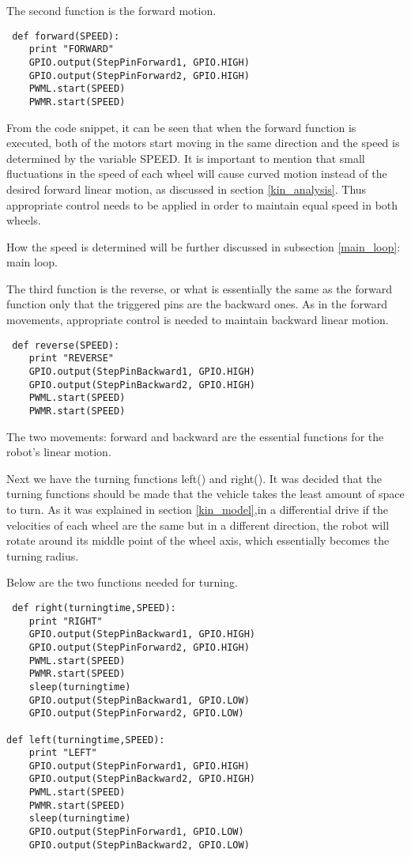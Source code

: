 The second function is the forward motion.

\begin{lstlisting}
 def forward(SPEED):
	print "FORWARD"
	GPIO.output(StepPinForward1, GPIO.HIGH)
	GPIO.output(StepPinForward2, GPIO.HIGH)
	PWML.start(SPEED)
	PWMR.start(SPEED)
\end{lstlisting}

From the code snippet, it can be seen that when the forward function is executed, both of the motors start moving in the same direction and the speed is determined by the variable SPEED. It is important to mention that small fluctuations in the speed of each wheel will cause curved motion instead of the desired forward linear motion, as discussed in section \ref{kin_analysis}. Thus appropriate control needs to be applied in order to maintain equal speed in both wheels. 

How the speed is determined will be further discussed in subsection \ref{main_loop}: main loop.

The third function is the reverse, or what is essentially the same as the forward function only that the triggered pins are the backward ones. As in the forward movements, appropriate control is needed to maintain backward linear motion.

\begin{lstlisting}
 def reverse(SPEED):
	print "REVERSE"
	GPIO.output(StepPinBackward1, GPIO.HIGH)
	GPIO.output(StepPinBackward2, GPIO.HIGH)
	PWML.start(SPEED)
	PWMR.start(SPEED)
\end{lstlisting}

The two movements: forward and backward are the essential functions for the robot's linear motion.

Next we have the turning functions left() and right().
It was decided that the turning functions should be made that the vehicle takes the least amount of space to turn.
As it was explained in section \ref{kin_model},in a differential drive if the velocities of each wheel are the same but in a different direction, the robot will rotate around its middle point of the wheel axis, which essentially becomes the turning radius.

Below are the two functions needed for turning.

\begin{lstlisting}
 def right(turningtime,SPEED):
	print "RIGHT"
	GPIO.output(StepPinBackward1, GPIO.HIGH)
	GPIO.output(StepPinForward2, GPIO.HIGH)
	PWML.start(SPEED)
	PWMR.start(SPEED)
	sleep(turningtime)
	GPIO.output(StepPinBackward1, GPIO.LOW)
	GPIO.output(StepPinForward2, GPIO.LOW)

def left(turningtime,SPEED):
	print "LEFT"
	GPIO.output(StepPinForward1, GPIO.HIGH)
	GPIO.output(StepPinBackward2, GPIO.HIGH)
	PWML.start(SPEED)
	PWMR.start(SPEED)
	sleep(turningtime)
	GPIO.output(StepPinForward1, GPIO.LOW)
	GPIO.output(StepPinBackward2, GPIO.LOW)
\end{lstlisting}

